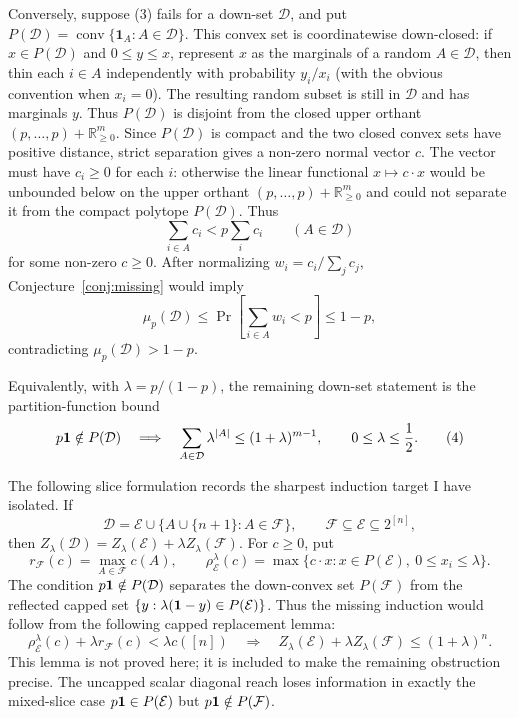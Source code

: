 \documentclass[12pt]{article}
\newcommand{\conv}{\operatorname{conv}}
\begin{document}
Conversely, suppose (3) fails for a down-set \(\mathcal D\), and put
\(P(\mathcal D)=\conv\{\mathbf1_A:A\in\mathcal D\}\).  This convex set is
coordinatewise down-closed: if \(x\in P(\mathcal D)\) and \(0\le y\le x\),
represent \(x\) as the marginals of a random \(A\in\mathcal D\), then thin each
\(i\in A\) independently with probability \(y_i/x_i\) (with the obvious
convention when \(x_i=0\)).  The resulting random subset is still in
\(\mathcal D\) and has marginals \(y\).  Thus \(P(\mathcal D)\) is disjoint
from the closed upper orthant
\((p,\ldots,p)+\mathbb R_{\ge0}^m\).  Since \(P(\mathcal D)\) is compact and
the two closed convex sets have positive distance, strict separation gives a
non-zero normal vector \(c\).  The vector must have \(c_i\ge0\) for
each \(i\): otherwise the linear functional \(x\mapsto c\cdot x\) would be
unbounded below on the upper orthant
\((p,\ldots,p)+\mathbb R_{\ge0}^m\) and could not separate it from the compact
polytope \(P(\mathcal D)\).  Thus
\[
      \sum_{i\in A}c_i < p\sum_i c_i
      \qquad(A\in\mathcal D)
\]
for some non-zero \(c\ge0\).
After normalizing \(w_i=c_i/\sum_jc_j\), Conjecture~\ref{conj:missing} would imply
\[
 \mu_p(\mathcal D)
 \le \Pr\!\left[\sum_{i\in A}w_i<p\right]\le1-p,
\]
contradicting \(\mu_p(\mathcal D)>1-p\).

Equivalently, with \(\lambda=p/(1-p)\), the remaining down-set statement is
the partition-function bound
\[
 p{\bf 1}\notin P(\mathcal D)
 \quad\Longrightarrow\quad
 \sum_{A\in\mathcal D}\lambda^{|A|}
 \le (1+\lambda)^{m-1},
 \qquad 0\le\lambda\le\frac12 .                         \tag{4}
\]

The following slice formulation records the sharpest induction target I have
isolated.  If
\[
 \mathcal D=\mathcal E\cup\{A\cup\{n+1\}:A\in\mathcal F\},\qquad
 \mathcal F\subseteq\mathcal E\subseteq2^{[n]},
\]
then \(Z_\lambda(\mathcal D)=Z_\lambda(\mathcal E)+\lambda Z_\lambda(\mathcal F)\).
For \(c\ge0\), put
\[
 r_{\mathcal F}(c)=\max_{A\in\mathcal F}c(A),\qquad
 \rho^\lambda_{\mathcal E}(c)=
 \max\{c\cdot x:x\in P(\mathcal E),\ 0\le x_i\le\lambda\}.
\]
The condition \(p{\bf1}\notin P(\mathcal D)\) separates the down-convex set
\(P(\mathcal F)\) from the reflected capped set
\(\{y:\lambda({\bf1}-y)\in P(\mathcal E)\}\).  Thus the missing induction would
follow from the following capped replacement lemma:
\[
 \rho^\lambda_{\mathcal E}(c)+\lambda r_{\mathcal F}(c)<\lambda c([n])
 \quad\Longrightarrow\quad
 Z_\lambda(\mathcal E)+\lambda Z_\lambda(\mathcal F)\le(1+\lambda)^n .
\]
This lemma is not proved here; it is included to make the remaining obstruction
precise.  The uncapped scalar diagonal reach loses information in exactly the
mixed-slice case \(p{\bf1}\in P(\mathcal E)\) but \(p{\bf1}\notin P(\mathcal F)\).
\end{document}
